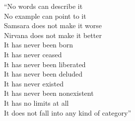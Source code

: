 ``No words can describe it\\
    No example can point to it\\
    Samsara does not make it worse\\
    Nirvana does not make it better\\
    It has never been born\\
    It has never ceased\\
    It has never been liberated\\
    It has never been deluded\\
    It has never existed\\
    It has never been nonexistent\\
    It has no limits at all\\
    It does not fall into any kind of category''\\


